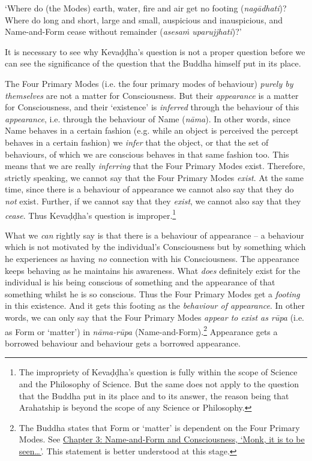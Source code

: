 `Where do (the Modes) earth, water, fire and air get no footing (\textit{nagādhati})? Where do long and short, large and small, auspicious and inauspicious, and Name-and-Form cease without remainder (\textit{asesaṁ uparujjhati})?'

It is necessary to see why Kevaḍḍha's question is not a proper question before we can see the significance of the question that the Buddha himself put in its place.

\protect\hypertarget{the-four-primary}{}{}The Four Primary Modes (i.e. the four primary modes of behaviour) \emph{purely by themselves} are not a matter for Consciousness. But their \emph{appearance} is a matter for Consciousness, and their `existence' is \emph{inferred} through the behaviour of this \emph{appearance}, i.e. through the behaviour of Name (\textit{nāma}). In other words, since Name behaves in a certain fashion (e.g. while an object is perceived the percept behaves in a certain fashion) we \emph{infer} that the object, or that the set of behaviours, of which we are conscious behaves in that same fashion too. This means that we are really \emph{inferring} that the Four Primary Modes exist. Therefore, strictly speaking, we cannot say that the Four Primary Modes \emph{exist}. At the same time, since there is a behaviour of appearance we cannot also say that they do \emph{not} exist. Further, if we cannot say that they \emph{exist}, we cannot also say that they \emph{cease}. Thus Kevaḍḍha's question is improper.\footnote{The impropriety of Kevaḍḍha's question is fully within the scope of Science and the Philosophy of Science. But the same does not apply to the question that the Buddha put in its place and to its answer, the reason being that Arahatship is beyond the scope of any Science or Philosophy.}

What we \emph{can} rightly say is that there is a behaviour of appearance -- a behaviour which is not motivated by the individual's Consciousness but by something which he experiences as having \emph{no} connection with his Consciousness. The appearance keeps behaving as he maintains his awareness. What \emph{does} definitely exist for the individual is his being conscious of something and the appearance of that something whilst he is so conscious. Thus the Four Primary Modes get a \emph{footing} in this existence. And it gets this footing as the \emph{behaviour of appearance}. In other words, we can only say that the Four Primary Modes \emph{appear to exist as rūpa} (i.e. as Form or `matter') in \textit{nāma-rūpa} (Name-and-Form).\footnote{The Buddha states that Form or `matter' is dependent on the Four Primary Modes. See \href{ch-03-name-and-form-and-consciousness.xml\#dependent}{Chapter 3: Name-and-Form and Consciousness, `Monk, it is to be seen\ldots\hspace{0pt}'}. This statement is better understood at this stage.} Appearance gets a borrowed behaviour and behaviour gets a borrowed appearance.

